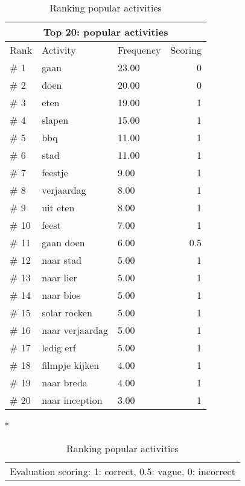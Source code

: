 \begin{table}[H]
\centering
\begin{tabular}{|l|l|l|r|}
\hline
\multicolumn{4}{|c|}{\textbf{Top 20: popular activities}}\\
\hline
Rank & Activity & Frequency & Scoring\\
\hline
\# 1 & gaan &                     23.00 & 0 \\
\# 2 & doen &                     20.00 & 0 \\
\# 3 & eten &                     19.00  & 1 \\
\# 4 & slapen &                   15.00  & 1 \\
\# 5  & bbq &                      11.00  & 1 \\
\# 6  & stad &                     11.00  & 1 \\
\# 7  & feestje &                  9.00  & 1 \\
\# 8  & verjaardag &               8.00  & 1 \\
\# 9  & uit eten &                8.00  & 1 \\
\# 10 & feest &                    7.00  & 1 \\
\# 11 & gaan doen &               6.00  & 0.5 \\
\# 12 & naar stad &               5.00  & 1 \\
\# 13 & naar lier &               5.00  & 1 \\
\# 14 & naar bios &               5.00  & 1 \\
\# 15 & solar rocken &            5.00  & 1 \\
\# 16 & naar verjaardag &         5.00  & 1 \\
\# 17 & ledig erf &               5.00  & 1 \\
\# 18 & filmpje kijken &          4.00  & 1 \\
\# 19 & naar breda &              4.00  & 1 \\
\# 20 & naar inception &          3.00  & 1 \\
\hline
\end{tabular}
\caption{Ranking popular activities}*{
   \begin{tabular}{c}
   	Evaluation scoring:
    1: correct, 0.5: vague, 0: incorrect\\
   \end{tabular}
 }\label{table:rank}

\end{table}


